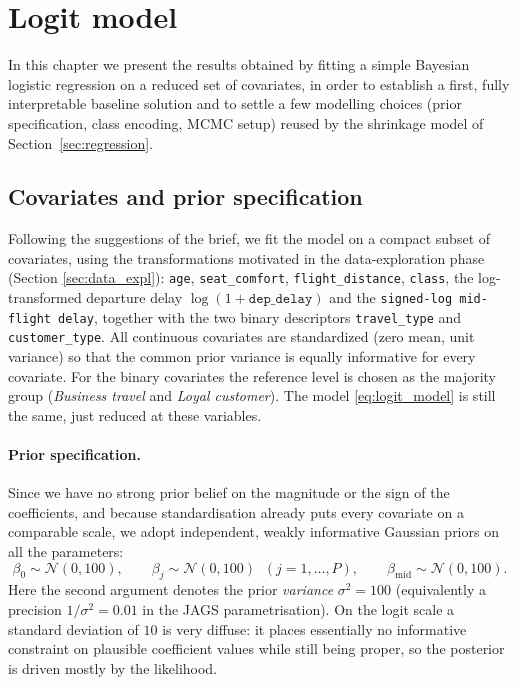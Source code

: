 \section{Logit model}
\label{sec:logit}

In this chapter we present the results obtained by fitting a simple Bayesian
logistic regression on a reduced set of covariates, in order to establish a
first, fully interpretable baseline solution and to settle a few modelling
choices (prior specification, class encoding, MCMC setup) reused by the
shrinkage model of Section~\ref{sec:regression}.

\subsection{Covariates and prior specification}
Following the suggestions of the brief, we fit the model on a compact subset of
covariates, using the transformations motivated in the data-exploration phase
(Section \ref{sec:data_expl}): \texttt{age}, \texttt{seat\_comfort},
\texttt{flight\_distance}, \texttt{class}, the log-transformed departure
delay $\log(1+\texttt{dep\_delay})$ and the \texttt{signed-log mid-flight delay}, together
with the two binary descriptors \texttt{travel\_type} and
\texttt{customer\_type}. All continuous covariates are standardized
(zero mean, unit variance) so that the common prior variance is equally
informative for every covariate. For the binary covariates the reference
level is chosen as the majority group (\textit{Business travel} and
\textit{Loyal customer}).
The model \ref{eq:logit_model} is still the same, just reduced at these variables.

\paragraph{Prior specification.}
Since we have no strong prior belief on the magnitude or the sign of the
coefficients, and because standardisation already puts every covariate on a
comparable scale, we adopt independent, weakly informative Gaussian priors on
all the parameters:
\begin{equation}
    \beta_0 \sim \mathcal{N}(0, 100), \qquad
    \beta_j \sim \mathcal{N}(0, 100) \;\; (j = 1,\dots,P), \qquad
    \beta_{\text{mid}} \sim \mathcal{N}(0, 100).
    \label{eq:priors}
\end{equation}
Here the second argument denotes the prior \emph{variance} $\sigma^2 = 100$
(equivalently a precision $1/\sigma^2 = 0.01$ in the JAGS
parametrisation). On the logit scale a standard deviation of $10$ is very
diffuse: it places essentially no informative constraint on plausible
coefficient values while still being proper, so the posterior is driven mostly
by the likelihood.

